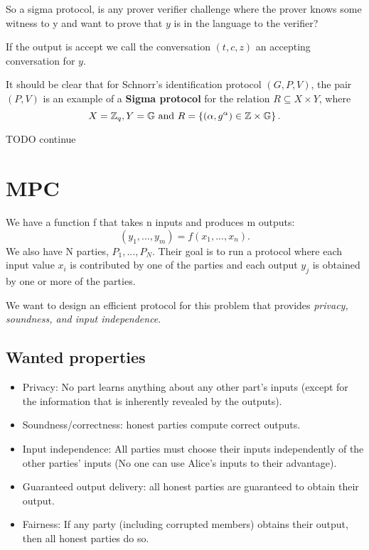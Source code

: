 \begin{rem}
So a sigma protocol, is any prover verifier challenge where the prover
knows some witness to y and want to prove that $y$ is in the language
to the verifier?
\end{rem}

If the output is accept we call the conversation $\left(t,c,z\right)$
an accepting conversation for $y$.
\begin{example}
It should be clear that for Schnorr\textquoteright s identification
protocol $\left(G,P,V\right)$, the pair $\left(P,V\right)$ is an
example of a \textbf{Sigma protocol} for the relation $R\subseteq X\times Y$,
where
\[
X=\mathbb{Z}_{q},Y=\mathbb{G}\text{ and }R=\left\{ \left(\alpha,g^{\alpha}\right)\in\mathbb{Z}\times\mathbb{G}\right\} .
\]

TODO continue
\end{example}


\chapter{MPC}
We have a function f that takes n inputs and produces m outputs:
$$  (y_1,...,y_m) = f(x_1,...,x_n).$$
We also have N parties, $P_1,...,P_N$. 
Their goal is to run a protocol where each input value $x_i$ is 
contributed by one of the parties and each output $y_j$ is obtained by one or more of
 the parties.


We want to design an efficient protocol for this problem that provides
\emph{ privacy, soundness, and input independence}.

\section{Wanted properties}
\begin{itemize}
  \item Privacy: No part learns anything about any other part's inputs
  (except for the information that is inherently revealed by the outputs).
  \item Soundness/correctness: honest parties compute correct outputs. 
  \item Input independence: All parties must choose their 
  inputs independently of the other parties' inputs 
  (No one can use Alice's inputs to their advantage).
  \item Guaranteed output delivery: all honest parties are guaranteed to obtain
  their output.
  \item Fairness: If any party (including corrupted members) obtains their output, 
  then all honest parties do so.
\end{itemize}
